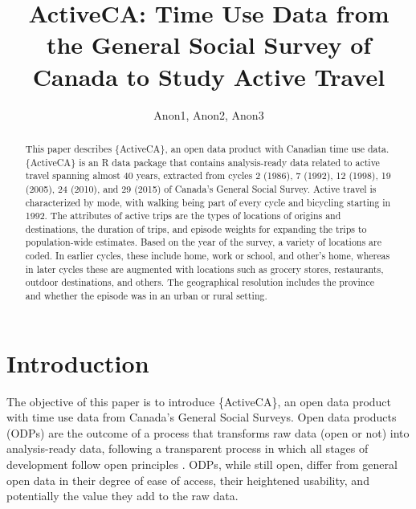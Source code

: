 \documentclass[Royal,times,sageh]{sagej}
\begin{document}

\title{ActiveCA: Time Use Data from the General Social Survey of Canada
to Study Active Travel}

\runninghead{}

\author{Anon1\affilnum{}, Anon2\affilnum{}, Anon3\affilnum{}}

\affiliation{\affilnum{}{}}



\begin{abstract}
This paper describes \{ActiveCA\}, an open data product with Canadian
time use data. \{ActiveCA\} is an R data package that contains
analysis-ready data related to active travel spanning almost 40 years,
extracted from cycles 2 (1986), 7 (1992), 12 (1998), 19 (2005), 24
(2010), and 29 (2015) of Canada's General Social Survey. Active travel
is characterized by mode, with walking being part of every cycle and
bicycling starting in 1992. The attributes of active trips are the types
of locations of origins and destinations, the duration of trips, and
episode weights for expanding the trips to population-wide estimates.
Based on the year of the survey, a variety of locations are coded. In
earlier cycles, these include home, work or school, and other's home,
whereas in later cycles these are augmented with locations such as
grocery stores, restaurants, outdoor destinations, and others. The
geographical resolution includes the province and whether the episode
was in an urban or rural setting.
\end{abstract}


\maketitle

\section{Introduction}\label{introduction}

The objective of this paper is to introduce \{ActiveCA\}, an open data
product with time use data from Canada's General Social Surveys. Open
data products (ODPs) are the outcome of a process that transforms raw
data (open or not) into analysis-ready data, following a transparent
process in which all stages of development follow open principles
\citep{arribas-bel2021}. ODPs, while still open, differ from general
open data in their degree of ease of access, their heightened usability,
and potentially the value they add to the raw data.
\end{document}
